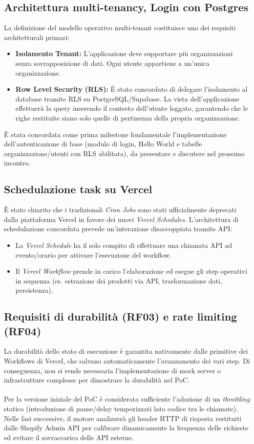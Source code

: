 \subsection{Architettura multi-tenancy, Login con Postgres}
La definizione del modello operativo multi-tenant costituisce uno dei requisiti architetturali primari:
\begin{itemize}
    \item \textbf{Isolamento Tenant:} L'applicazione deve supportare più organizzazioni senza sovrapposizione di dati. Ogni utente appartiene a un'unica organizzazione.
    \item \textbf{Row Level Security (RLS):} È stato concordato di delegare l'isolamento al database tramite RLS su PostgreSQL/Supabase. La vista dell'applicazione effettuerà la query inserendo il contesto dell'utente loggato, garantendo che le righe restituite siano solo quelle di pertinenza della propria organizzazione.
    \end{itemize}
È stata concordata come prima milestone fondamentale l'implementazione dell'autenticazione di base (modulo di login, Hello World e tabelle organizzazione/utenti con RLS abilitata), da presentare e discutere nel prossimo incontro.

\subsection{Schedulazione task su Vercel}
È stato chiarito che i tradizionali \textit{Cron Jobs} sono stati ufficialmente deprecati dalla piattaforma Vercel in favore dei nuovi \textit{Vercel Schedules}. L'architettura di schedulazione concordata prevede un'interazione disaccoppiata tramite API:
\begin{itemize}
    \item La \textit{Vercel Schedule} ha il solo compito di effettuare una chiamata API ad evento/orario per attivare l'esecuzione del workflow.
    \item Il \textit{Vercel Workflow} prende in carico l'elaborazione ed esegue gli step operativi in sequenza (es. estrazione dei prodotti via API, trasformazione dati, persistenza).
\end{itemize}

\subsection{Requisiti di durabilità (RF03) e rate limiting (RF04)}
La durabilità dello stato di esecuzione è garantita nativamente dalle primitive dei Workflows di Vercel, che salvano automaticamente l'avanzamento dei vari step. Di conseguenza, non si rende necessaria l'implementazione di mock server o infrastrutture complesse per dimostrare la durabilità nel PoC.
\\ \\
Per la versione iniziale del PoC è considerata sufficiente l'adozione di un \textit{throttling} statico (introduzione di pause/delay temporizzati lato codice tra le chiamate). Nelle fasi successive, il motore analizzerà gli header HTTP di risposta restituiti dalle Shopify Admin API per calibrare dinamicamente la frequenza delle richieste ed evitare il sovraccarico delle API esterne.


